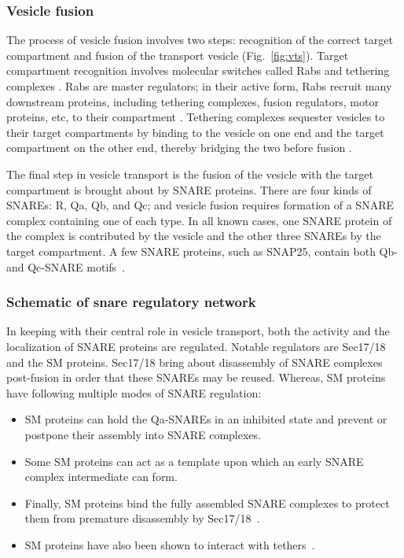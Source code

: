\subsubsection{Vesicle fusion} 
The process of vesicle fusion involves two steps: recognition of the correct target compartment and fusion of the transport vesicle (Fig.~\ref{fig:vts}). 
%
Target compartment recognition involves molecular
switches called Rabs and tethering complexes \cite{rink2005rab}. 
%
Rabs are master regulators; in their active form, Rabs recruit many downstream proteins, including tethering complexes, fusion regulators, motor proteins, etc, to their compartment \cite{muller2018molecular}. 
%
Tethering complexes sequester vesicles to their target compartments by binding to the vesicle on one end and the target compartment on the other end, thereby bridging the two
before fusion \cite{baker2016chaperoning}.

The final step in vesicle transport is the fusion of the vesicle with the target compartment is brought about by SNARE proteins. 
%
There are four kinds of SNAREs: R, Qa, Qb, and Qc; and vesicle fusion requires formation of a SNARE complex containing one of each type. 
%
In all known cases, one SNARE protein of the complex is contributed by the vesicle and the other three SNAREs by the target compartment. 
%
A few SNARE proteins, such as SNAP25, contain both Qb- and Qc-SNARE motifs~\cite{yoon2018snare}.

\subsubsection{Schematic of snare regulatory network}
In keeping with their central role in vesicle transport, both the activity and the localization of SNARE proteins are regulated. Notable regulators are Sec17/18 and the SM proteins.
%
Sec17/18 bring about disassembly of SNARE complexes post-fusion in order that these SNAREs may be reused. 
%
Whereas, SM proteins have following multiple modes of SNARE regulation: 
\begin{itemize}
	\item SM proteins can hold
	the Qa-SNAREs in an inhibited state and prevent or postpone their assembly into SNARE
	complexes.
	\item Some SM proteins can act as a template upon which an early SNARE complex intermediate can form.
	\item Finally, SM proteins bind the fully assembled
	SNARE complexes to protect them from premature disassembly by Sec17/18~\cite{baker2016chaperoning}.
	\item SM proteins have also been shown to interact with tethers~\cite{yoon2018snare}.
\end{itemize}

